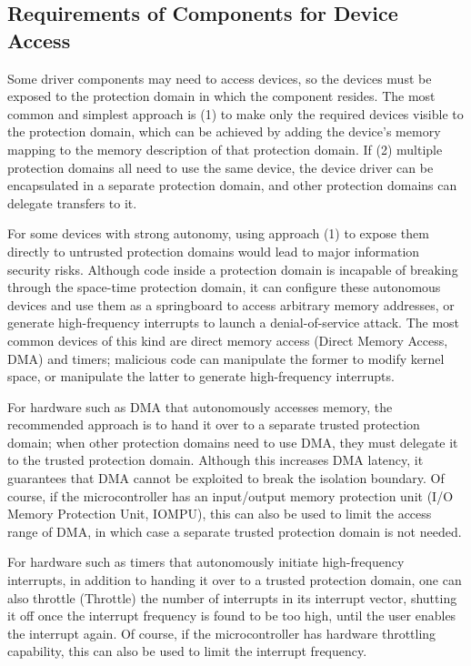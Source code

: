 \subsection{Requirements of Components for Device Access}\label{subsec:6-2-3}

Some driver components may need to access devices, so the devices must be exposed to the protection domain in which the component resides. The most common and simplest approach is (1) to make only the required devices visible to the protection domain, which can be achieved by adding the device's memory mapping to the memory description of that protection domain. If (2) multiple protection domains all need to use the same device, the device driver can be encapsulated in a separate protection domain, and other protection domains can delegate transfers to it.

For some devices with strong autonomy, using approach (1) to expose them directly to untrusted protection domains would lead to major information security risks. Although code inside a protection domain is incapable of breaking through the space-time protection domain, it can configure these autonomous devices and use them as a springboard to access arbitrary memory addresses, or generate high-frequency interrupts to launch a denial-of-service attack. The most common devices of this kind are direct memory access (Direct
Memory
Access, DMA) and timers; malicious code can manipulate the former to modify kernel space, or manipulate the latter to generate high-frequency interrupts.

For hardware such as DMA that autonomously accesses memory, the recommended approach is to hand it over to a separate trusted protection domain; when other protection domains need to use DMA, they must delegate it to the trusted protection domain. Although this increases DMA latency, it guarantees that DMA cannot be exploited to break the isolation boundary. Of course, if the microcontroller has an input/output memory protection unit (I/O
Memory Protection
Unit, IOMPU), this can also be used to limit the access range of DMA, in which case a separate trusted protection domain is not needed.

For hardware such as timers that autonomously initiate high-frequency interrupts, in addition to handing it over to a trusted protection domain, one can also throttle (Throttle) the number of interrupts in its interrupt vector, shutting it off once the interrupt frequency is found to be too high, until the user enables the interrupt again. Of course, if the microcontroller has hardware throttling capability, this can also be used to limit the interrupt frequency.

